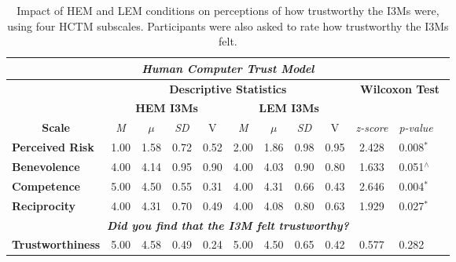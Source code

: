 \begin{table*}[!ht]
\caption{Impact of HEM and LEM conditions on perceptions of how trustworthy the I3Ms were, using four HCTM subscales. Participants were also asked to rate how trustworthy the I3Ms felt.}
\label{table:3}
\begin{tabular}{@{}cccccccccccclll@{}}
\toprule
\multicolumn{15}{c}{\textit{\textbf{Human Computer Trust Model}}} \\ \midrule
\multicolumn{1}{c|}{\multirow{2}{*}{}} &
  \multicolumn{8}{c|}{\textbf{Descriptive Statistics}} &
  \multicolumn{6}{c}{\textbf{Wilcoxon Test}} \\
\multicolumn{1}{c|}{} &
  \multicolumn{4}{c|}{\textbf{HEM I3Ms}} &
  \multicolumn{4}{c|}{\textbf{LEM I3Ms}} &
  \multicolumn{6}{c}{\textbf{}} \\
\multicolumn{1}{c|}{\textbf{Scale}} &
  \textit{M} &
  $\mu$ &
  \textit{SD} &
  \multicolumn{1}{c|}{V} &
  \textit{M} &
  $\mu$ &
  \textit{SD} &
  \multicolumn{1}{c|}{V} &
  \textit{z-score} &
  \textit{p-value} &
  \multicolumn{4}{c}{} \\ \midrule
\multicolumn{1}{l|}{\textbf{Perceived Risk}} &
  1.00 &
  1.58 &
  0.72 &
  \multicolumn{1}{c|}{0.52} &
  2.00 &
  1.86 &
  0.98 &
  \multicolumn{1}{c|}{0.95} &
  2.428 &
  \multicolumn{1}{l}{0.008$^\ast$} &
  \multicolumn{4}{c}{} \\
\multicolumn{1}{l|}{\textbf{Benevolence}} &
  4.00 &
  4.14 &
  0.95 &
  \multicolumn{1}{c|}{0.90} &
  4.00 &
  4.03 &
  0.90 &
  \multicolumn{1}{c|}{0.80} &
  1.633 &
  \multicolumn{1}{l}{0.051$^\wedge$} &
  \multicolumn{4}{c}{} \\
\multicolumn{1}{l|}{\textbf{Competence}} &
  5.00 &
  4.50 &
  0.55 &
  \multicolumn{1}{c|}{0.31} &
  4.00 &
  4.31 &
  0.66 &
  \multicolumn{1}{c|}{0.43} &
  2.646 &
  \multicolumn{1}{l}{0.004$^\ast$} &
  \multicolumn{4}{c}{} \\
\multicolumn{1}{l|}{\textbf{Reciprocity}} &
  4.00 &
  4.31 &
  0.70 &
  \multicolumn{1}{c|}{0.49} &
  4.00 &
  4.08 &
  0.80 &
  \multicolumn{1}{c|}{0.63} &
  1.929 &
  \multicolumn{1}{l}{0.027$^\ast$} &
  \multicolumn{4}{c}{} \\ \midrule
\multicolumn{15}{c}{\textit{\textbf{Did you find that the I3M felt trustworthy?}}} \\ \midrule
\multicolumn{1}{l|}{\textbf{Trustworthiness}}  &
  5.00 &
  4.58 &
  0.49 &
  \multicolumn{1}{c|}{0.24} &
  5.00 &
  4.50 &
  0.65 &
  \multicolumn{1}{c|}{0.42} &
  0.577 &
  \multicolumn{1}{l}{0.282} &
  \multicolumn{4}{c}{} \\ \bottomrule
\end{tabular}
\end{table*}